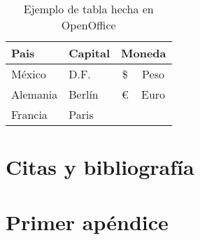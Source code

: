 \documentclass[12pt, a4paper,twoside]{article} %
\begin{document}
\begin{table}[htbp]
\begin{center}
\begin{tabular}{|l|l|c|c|}
\hline
\textbf{Pais} & \textbf{Capital} & \multicolumn{ 2}{c|}{\textbf{Moneda}} \\ \hline
México & D.F. & \$ & Peso \\ \hline
Alemania & Berlín & \multicolumn{ 1}{c|}{€} & \multicolumn{ 1}{c|}{Euro} \\ \cline{ 1- 2}
Francia & Paris & \multicolumn{ 1}{c|}{} & \multicolumn{ 1}{c|}{} \\ \hline
\end{tabular}
\end{center}
\caption{Ejemplo de tabla hecha en OpenOffice}
\label{tab:openoffice}
\end{table}

\section{Citas y bibliografía}
\clearpage



\clearpage
\appendix
\addappheadtotoc
\appendixpage
\section{Primer apéndice}
\end{document}
